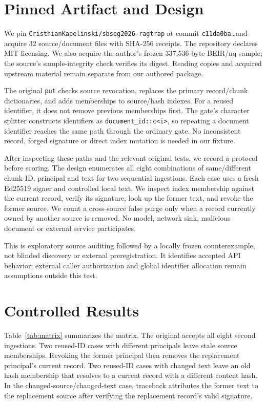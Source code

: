 \documentclass[sigconf,nonacm]{acmart}
\begin{document}
\section{Pinned Artifact and Design}
We pin \texttt{CristhianKapelinski/sbseg2026-ragtrap} at commit \texttt{c11da0ba}\ldots and acquire 32 source/document files with SHA-256 receipts. The repository declares MIT licensing. We also acquire the author's frozen 337,536-byte BEIR/nq sample; the source's sample-integrity check verifies its digest. Reading copies and acquired upstream material remain separate from our authored package.

The original \texttt{put} checks source revocation, replaces the primary record/chunk dictionaries, and adds memberships to source/hash indexes. For a reused identifier, it does not remove previous memberships first. The gate's character splitter constructs identifiers as \texttt{document\_id::c<i>}, so repeating a document identifier reaches the same path through the ordinary gate. No inconsistent record, forged signature or direct index mutation is needed in our fixture.

After inspecting these paths and the relevant original tests, we record a protocol before scoring. The design enumerates all eight combinations of same/different chunk ID, principal and text for two sequential ingestions. Each case uses a fresh Ed25519 signer and controlled local text. We inspect index membership against the current record, verify its signature, look up the former text, and revoke the former source. We count a cross-source false purge only when a record currently owned by another source is removed. No model, network sink, malicious document or external service participates.

This is exploratory source auditing followed by a locally frozen counterexample, not blinded discovery or external preregistration. It identifies accepted API behavior; external caller authorization and global identifier allocation remain assumptions outside this test.

\section{Controlled Results}
Table~\ref{tab:matrix} summarizes the matrix. The original accepts all eight second ingestions. Two reused-ID cases with different principals leave stale source memberships. Revoking the former principal then removes the replacement principal's current record. Two reused-ID cases with changed text leave an old hash membership that resolves to a current record with a different content hash. In the changed-source/changed-text case, traceback attributes the former text to the replacement source after verifying the replacement record's valid signature.
\end{document}
